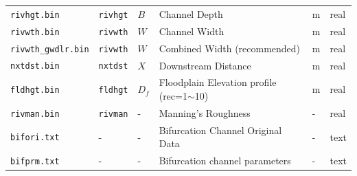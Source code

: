 \begin{table}[]
\begin{tabular}[h]{p{3.5cm}p{1.5cm}p{1.5cm}p{5cm}p{1cm}p{1cm}}
    \texttt{rivhgt.bin}         & \texttt{rivhgt}   & $B$                         & Channel Depth                          & m       & real    \\
    \texttt{rivwth.bin}        & \texttt{rivwth}   & $W$                        & Channel Width                           & m       & real    \\
    \texttt{rivwth\_gwdlr.bin} & \texttt{rivwth}   & $W$                    & Combined Width (recommended)    & m       & real    \\
    \texttt{nxtdst.bin}        & \texttt{nxtdst}   & $X$                             & Downstream Distance                          & m       & real    \\
    \texttt{fldhgt.bin}        & \texttt{fldhgt}   & $D_f$                            & Floodplain Elevation profile (rec=1$\sim$10) & m       & real    \\
    \texttt{rivman.bin}        & \texttt{rivman}   & -                             & Manning’s Roughness                          & -       & real    \\
    \texttt{bifori.txt}        & -        & -                             & Bifurcation Channel Original Data            & -       & text    \\
    \texttt{bifprm.txt}        & -        & -                             & Bifurcation channel parameters               & -       & text    \\ \bottomrule
    \end{tabular}
\end{table}



